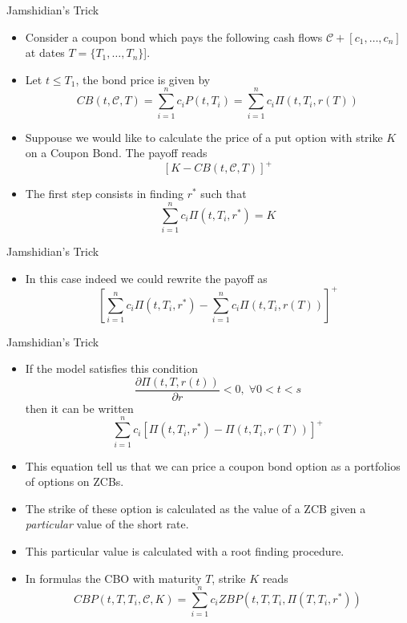 \documentclass{beamer}
\begin{document}
\begin{frame}{Jamshidian's Trick}
	\begin{itemize}
		\item Consider a coupon bond which pays the following cash flows $\mathcal{C}+[c_1,\dots,c_n]$ at dates $T=\{T_1,\ldots,T_n\}$].
		\item Let $t\leq T_1$, the bond price is given by
		\begin{equation}
			CB(t,\mathcal{C},T)=\sum_{i=1}^n c_i P(t,T_i) =\sum_{i=1}^n c_i \Pi(t, T_i, r(T))
		\end{equation}
		\item Suppouse we would like to calculate the price of a put option with strike $K$ on a Coupon Bond. The payoff reads
		\begin{equation}
			\left[K-CB(t,\mathcal{C},T)\right]^+
		\end{equation}
		\item The first step consists in finding $r^*$ such that
		\begin{equation}
			\sum_{i=1}^n c_i \Pi(t, T_i, r^*) = K
		\end{equation}
	\end{itemize}
\end{frame}

\begin{frame}{Jamshidian's Trick}
	\begin{itemize}
		\item In this case indeed we could rewrite the payoff as 
		\begin{equation}
			\left[\sum_{i=1}^n c_i \Pi(t, T_i, r^*)-\sum_{i=1}^n c_i \Pi(t, T_i, r(T))\right]^+
		\end{equation}
	\end{itemize}
\end{frame}

\begin{frame}{Jamshidian's Trick}
	\begin{itemize}
		\item If the model satisfies this condition
		\begin{equation}
			\frac{\partial \Pi(t,T,r(t))}{\partial r}<0,\;\forall 0<t<s
		\end{equation}
		then it can be written
		\begin{equation}
			\sum_{i=1}^n c_i [\Pi(t, T_i, r^*)-\Pi(t, T_i, r(T))]^+
		\end{equation}
		\item This equation tell us that we can price a coupon bond option as a portfolios of options on ZCBs.
		\item The strike of these option is calculated as the value of a ZCB given a \emph{particular} value of the short rate.
		\item This particular value is calculated with a root finding procedure.
		\item In formulas the CBO with maturity $T$, strike $K$ reads
		\begin{equation}
			CBP(t,T,T_i,\mathcal{C},K) = \sum_{i=1}^n c_i ZBP(t,T,T_i,\Pi(T,T_i,r^*))
		\end{equation}
	\end{itemize}
\end{frame}
\end{document}
